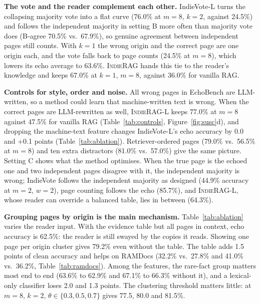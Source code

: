 \documentclass[sigconf,review,anonymous]{acmart}
\newcommand{\sys}{\textsc{IndieRAG}}
\newcommand{\para}[1]{\smallskip\noindent\textbf{#1}\enspace}
\begin{document}


\para{The vote and the reader complement each other.} IndieVote-L turns the collapsing majority vote into a flat curve
(76.0\% at $m{=}8$, $k{=}2$, against 24.5\%) and follows the independent majority in setting B more often than majority
vote does (B-agree 70.5\% vs.\ 67.9\%), so genuine agreement between independent pages still counts. With $k{=}1$
the wrong origin and the correct page are one origin each, and the vote falls back to page counts (24.5\% at $m{=}8$),
which lowers its echo average to 63.6\%. \sys{} hands this tie to the reader's knowledge and keeps 67.0\% at $k{=}1$,
$m{=}8$, against 36.0\% for vanilla RAG.



\para{Controls for style, order and noise.} All wrong pages in EchoBench are LLM-written, so a method could learn that
machine-written text is wrong. When the correct pages are LLM-rewritten as well, \sys{}-L keeps
77.0\% at $m{=}8$ against 47.5\% for vanilla RAG (Table~\ref{tab:controls}, Figure~\ref{fig:susc}d), and dropping the
machine-text feature changes IndieVote-L's echo accuracy by 0.0 and +0.1 points (Table~\ref{tab:ablation}).
Retriever-ordered pages (79.0\% vs.\ 56.5\% at $m{=}8$) and ten extra distractors (81.0\% vs.\ 57.0\%) give the same
picture. Setting C shows what the method optimises. When the true page is the echoed one and two independent pages
disagree with it, the independent majority is wrong; IndieVote follows the independent majority as designed (44.9\%
accuracy at $m{=}2$, $w{=}2$), page counting follows the echo (85.7\%), and \sys{}-L, whose reader can override a
balanced table, lies in between (64.3\%).



\para{Grouping pages by origin is the main mechanism.} Table~\ref{tab:ablation} varies the reader input. With the
evidence table but all pages in context, echo accuracy is 62.5\%: the reader is still swayed by the copies it reads.
Showing one page per origin cluster gives 79.2\% even without the table. The table adds 1.5 points of clean accuracy and
helps on RAMDocs (32.2\% vs.\ 27.8\% and 41.0\% vs.\ 36.2\%, Table~\ref{tab:ramdocs}). Among the features, the rare-fact group matters most end to end (63.6\% to 62.9\% and 67.1\%
to 66.3\% without it), and a lexical-only classifier loses 2.0 and 1.3 points. The clustering threshold matters
little: at $m{=}8$, $k{=}2$, $\theta\in\{0.3,0.5,0.7\}$ gives 77.5, 80.0 and 81.5\%.
\end{document}
